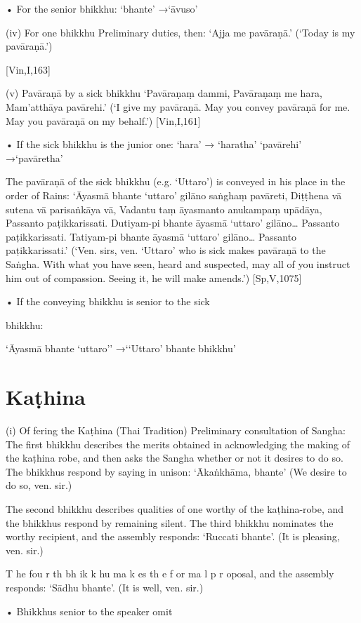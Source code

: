 • For the senior bhikkhu: ‘bhante’ →‘āvuso’

(iv) For one bhikkhu
Preliminary duties, then:
‘Ajja me pavāraṇā.’
(‘Today is my pavāraṇā.’)

[Vin,I,163]

(v) Pavāraṇā by a sick bhikkhu
‘Pavāraṇaṃ dammi,
Pavāraṇaṃ me hara,
Mam'atthāya pavārehi.’
(‘I give my pavāraṇā. May you convey pavāraṇā for
me. May you pavāraṇā on my behalf.’)
[Vin,I,161]

• If the sick bhikkhu is the junior one:
‘hara’ → ‘haratha’
‘pavārehi’ →‘pavāretha’

The pavāraṇā of the sick bhikkhu (e.g. ‘Uttaro’)
is conveyed in his place in the order of Rains:
‘Āyasmā bhante ‘uttaro’ gilāno saṅghaṃ pavāreti,
Diṭṭhena vā sutena vā parisaṅkāya vā,
Vadantu taṃ āyasmanto anukampaṃ upādāya,
Passanto paṭikkarissati.
Dutiyam-pi bhante āyasmā ‘uttaro’ gilāno…
Passanto paṭikkarissati.
Tatiyam-pi bhante āyasmā ‘uttaro’ gilāno…
Passanto paṭikkarissati.’
(‘Ven. sirs, ven. ‘Uttaro’ who is sick makes pavāraṇā
to the Saṅgha. With what you have seen, heard and
suspected, may all of you instruct him out of
compassion. Seeing it, he will make amends.’)
[Sp,V,1075]

• If the conveying bhikkhu is senior to the sick

bhikkhu:

‘Āyasmā bhante ‘uttaro’’
→‘‘Uttaro’ bhante bhikkhu’

\section{Kaṭhina}

(i) Of fering the Kaṭhina (Thai Tradition)
Preliminary consultation of Sangha:
The first bhikkhu describes the merits obtained
in acknowledging the making of the kaṭhina
robe, and then asks the Sangha whether or not
it desires to do so. The bhikkhus respond by
saying in unison:
‘Ākaṅkhāma, bhante’
(We desire to do so, ven. sir.)

The second bhikkhu describes qualities of one
worthy of the kaṭhina-robe, and the bhikkhus
respond by remaining silent.
The third bhikkhu nominates the worthy
recipient, and the assembly responds:
‘Ruccati bhante’.
(It is pleasing, ven. sir.)

T he fou r th bh ik k hu ma k es th e f or ma l p r oposal, and the assembly responds:
‘Sādhu bhante’.
(It is well, ven. sir.)

• Bhikkhus senior to the speaker omit

